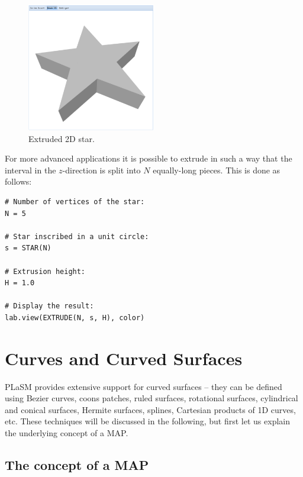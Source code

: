 \documentclass[article,A4,12pt]{llncs}
\begin{document}
\newpage

\begin{figure}[!ht]
\begin{center}
\includegraphics[width=0.5\textwidth]{img/star-2.png}
\end{center}
\vspace{-2mm}
\caption{Extruded 2D star.}
\label{fig:star-2}
\end{figure}
\noindent
For more advanced applications it is possible to extrude in such a way that 
the interval in the $z$-direction is split into $N$ equally-long pieces.
This is done as follows:

\begin{verbatim}
# Number of vertices of the star:
N = 5

# Star inscribed in a unit circle:
s = STAR(N)

# Extrusion height:
H = 1.0

# Display the result:
lab.view(EXTRUDE(N, s, H), color)
\end{verbatim}



\section{Curves and Curved Surfaces}\label{sec:curves}

PLaSM provides extensive support for curved surfaces -- they can be defined
using Bezier curves, coons patches, ruled surfaces, rotational surfaces, 
cylindrical and conical surfaces, Hermite surfaces, 
splines, Cartesian products of 1D curves, etc. These techniques will be 
discussed in the following, but first let us explain the underlying 
concept of a MAP.

\subsection{The concept of a MAP}
\end{document}
